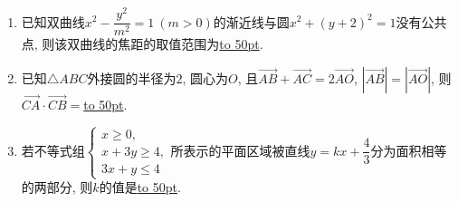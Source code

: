 \documentclass[10pt,a4paper]{article}
\newcommand{\blank}[1]{\underline{\hbox to #1pt{}}}
\begin{document}
\begin{enumerate}[1.]
\begin{center}
\end{center}
\item 已知双曲线$x^2-\dfrac{y^2}{m^2}=1 \ (m>0)$的渐近线与圆$x^2+(y+2)^2=1$没有公共点, 则该双曲线的焦距的取值范围为\blank{50}.
\item 已知$\triangle ABC$外接圆的半径为$2$, 圆心为$O$, 且$\overrightarrow{AB}+\overrightarrow{AC}=2 \overrightarrow{AO}$, $|\overrightarrow{AB}|=|\overrightarrow{AO}|$, 则$\overrightarrow{CA}\cdot \overrightarrow{CB}=$\blank{50}.
\item 若不等式组$\begin{cases} x\ge 0, \\ x+3y\ge 4, \\  3x+y\le 4 \end{cases}$所表示的平面区域被直线$y=kx+\dfrac 43$分为面积相等的两部分, 则$k$的值是\blank{50}.
\end{enumerate}
\end{document}
